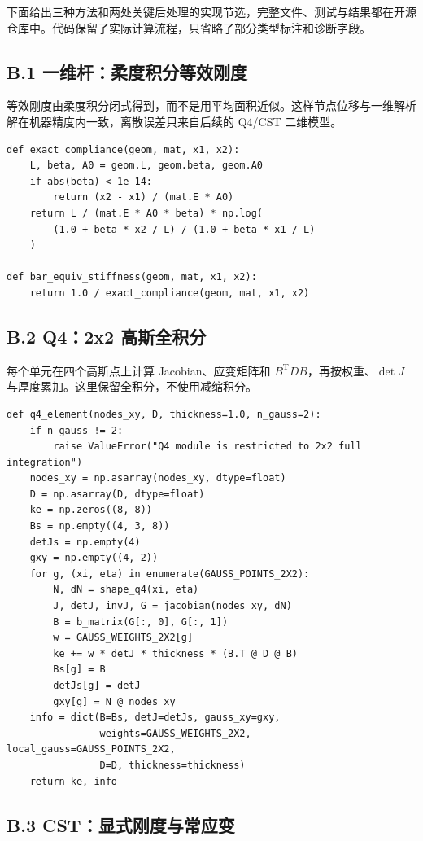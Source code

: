下面给出三种方法和两处关键后处理的实现节选，完整文件、测试与结果都在开源仓库中。代码保留了实际计算流程，只省略了部分类型标注和诊断字段。

\subsection*{B.1 一维杆：柔度积分等效刚度}

等效刚度由柔度积分闭式得到，而不是用平均面积近似。这样节点位移与一维解析解在机器精度内一致，离散误差只来自后续的 Q4/CST 二维模型。

\begin{lstlisting}
def exact_compliance(geom, mat, x1, x2):
    L, beta, A0 = geom.L, geom.beta, geom.A0
    if abs(beta) < 1e-14:
        return (x2 - x1) / (mat.E * A0)
    return L / (mat.E * A0 * beta) * np.log(
        (1.0 + beta * x2 / L) / (1.0 + beta * x1 / L)
    )

def bar_equiv_stiffness(geom, mat, x1, x2):
    return 1.0 / exact_compliance(geom, mat, x1, x2)
\end{lstlisting}

\subsection*{B.2 Q4：2x2 高斯全积分}

每个单元在四个高斯点上计算 Jacobian、应变矩阵和 $B^{\mathrm T}DB$，再按权重、$\det J$ 与厚度累加。这里保留全积分，不使用减缩积分。

\begin{lstlisting}
def q4_element(nodes_xy, D, thickness=1.0, n_gauss=2):
    if n_gauss != 2:
        raise ValueError("Q4 module is restricted to 2x2 full integration")
    nodes_xy = np.asarray(nodes_xy, dtype=float)
    D = np.asarray(D, dtype=float)
    ke = np.zeros((8, 8))
    Bs = np.empty((4, 3, 8))
    detJs = np.empty(4)
    gxy = np.empty((4, 2))
    for g, (xi, eta) in enumerate(GAUSS_POINTS_2X2):
        N, dN = shape_q4(xi, eta)
        J, detJ, invJ, G = jacobian(nodes_xy, dN)
        B = b_matrix(G[:, 0], G[:, 1])
        w = GAUSS_WEIGHTS_2X2[g]
        ke += w * detJ * thickness * (B.T @ D @ B)
        Bs[g] = B
        detJs[g] = detJ
        gxy[g] = N @ nodes_xy
    info = dict(B=Bs, detJ=detJs, gauss_xy=gxy,
                weights=GAUSS_WEIGHTS_2X2, local_gauss=GAUSS_POINTS_2X2,
                D=D, thickness=thickness)
    return ke, info
\end{lstlisting}

\subsection*{B.3 CST：显式刚度与常应变}


